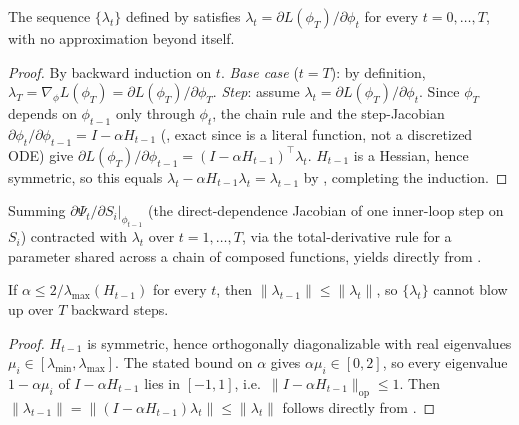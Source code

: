 \begin{proposition}
\label{prop:supp_exact}
The sequence $\{\lambda_t\}$ defined by  satisfies $\lambda_t=\partial L(\phi_T)/\partial\phi_t$ for every $t=0,\dots,T$, with no approximation beyond  itself.
\end{proposition}
\begin{proof}
By backward induction on $t$. \emph{Base case} ($t{=}T$): by definition, $\lambda_T=\nabla_\phi L(\phi_T)=\partial L(\phi_T)/\partial\phi_T$. \emph{Step}: assume $\lambda_t=\partial L(\phi_T)/\partial\phi_t$. Since $\phi_T$ depends on $\phi_{t-1}$ only through $\phi_t$, the chain rule and the step-Jacobian $\partial\phi_t/\partial\phi_{t-1}=I-\alpha H_{t-1}$ (, exact since  is a literal function, not a discretized ODE) give $\partial L(\phi_T)/\partial\phi_{t-1}=(I-\alpha H_{t-1})^\top\lambda_t$. $H_{t-1}$ is a Hessian, hence symmetric, so this equals $\lambda_t-\alpha H_{t-1}\lambda_t=\lambda_{t-1}$ by , completing the induction.
\end{proof}
Summing $\partial\Psi_t/\partial S_i\big|_{\phi_{t-1}}$ (the direct-dependence Jacobian of one inner-loop step on $S_i$) contracted with $\lambda_t$ over $t=1,\dots,T$, via the total-derivative rule for a parameter shared across a chain of composed functions, yields  directly from .

\begin{proposition}
\label{prop:supp_nonexpansive}
If $\alpha\le 2/\lambda_{\max}(H_{t-1})$ for every $t$, then $\|\lambda_{t-1}\|\le\|\lambda_t\|$, so $\{\lambda_t\}$ cannot blow up over $T$ backward steps.
\end{proposition}
\begin{proof}
$H_{t-1}$ is symmetric, hence orthogonally diagonalizable with real eigenvalues $\mu_i\in[\lambda_{\min},\lambda_{\max}]$. The stated bound on $\alpha$ gives $\alpha\mu_i\in[0,2]$, so every eigenvalue $1-\alpha\mu_i$ of $I-\alpha H_{t-1}$ lies in $[-1,1]$, i.e.\ $\|I-\alpha H_{t-1}\|_{\mathrm{op}}\le1$. Then $\|\lambda_{t-1}\|=\|(I-\alpha H_{t-1})\lambda_t\|\le\|\lambda_t\|$ follows directly from .
\end{proof}

